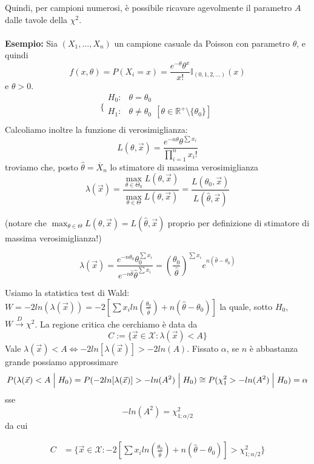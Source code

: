 Quindi, per campioni numerosi, è possibile ricavare agevolmente il parametro $A$ dalle tavole della $\chi^2$.\\
\\
\noindent \textbf{Esempio:} Sia $(X_1,...,X_n)$ un campione casuale da Poisson con parametro $\theta$, e quindi $$f(x,\theta) = P(X_i = x) = \frac{e^{-\theta} \theta^x}{x!} \mathbb{I}_{(0,1,2,...)}(x)$$ e $\theta>0$.
$$\bigg \{
\begin{array}{rl}
H_0: & \theta = \theta_0  \\
H_1: & \theta \neq \theta_0 \ \ [\theta \in \mathbb{R}^+ \setminus \{\theta_0\}]\\
\end{array}
$$
Calcoliamo inoltre la funzione di verosimiglianza:
$$L(\theta,\vec{x})=\frac{e^{-n\theta} \theta^{\sum x_i}}{\prod_{i=1}^n x_i!}$$
troviamo che, posto $\hat{\theta} = \overline{X}_n$ lo stimatore di massima verosimiglianza
$$\lambda(\vec{x}) = \frac{\max_{\theta \in \Theta_0} L(\theta,\vec{x})}{\max_{\theta \in \Theta} L(\theta,\vec{x})} = \frac{L(\theta_0,\vec{x})}{L(\hat{\theta},\vec{x})}$$

(notare che $\max_{\theta \in \Theta} L(\theta,\vec{x})=L(\hat{\theta},\vec{x}) $ proprio per definizione di stimatore di massima verosimiglianza!)

$$\lambda(\vec{x}) = \dfrac{ e^{-n\theta_0} \theta_0^{\sum x_i}}{e^{-n\hat{\theta}} \hat{\theta}^{\sum x_i}} = 
\left( \frac{\theta_0}{\hat{\theta}} \right)^{\sum x_i} e^{n(\hat{\theta} - \theta_0)}$$

Usiamo la statistica test di Wald:
$W = -2 ln (\lambda (\vec{x})) =  -2\left[\sum x_i ln \left( \frac{\theta_0}{\hat{\theta}} \right) + n(\hat{\theta} - \theta_0) \right]$
la quale, sotto $H_0$, $W \stackrel{D}{\longrightarrow} \chi^2$.
La regione critica che cerchiamo è data da
$$C := \{ \vec{x} \in \mathcal{X}: \lambda(\vec{x})<A \}$$
Vale $\lambda(\vec{x})<A \Leftrightarrow -2ln[ \lambda(\vec{x})]> -2ln(A)$.
Fissato $\alpha$, se $n$ è abbastanza grande possiamo approssimare
 $$P(\lambda(\vec{x})<A \Bigm\vert H_0) = P(-2ln[ \lambda(\vec{x})]> -ln(A^2) \Bigm\vert H_0) \cong P(\chi^2_1> -ln(A^2)\Bigm\vert H_0) = \alpha$$ sse $$-ln(A^2) = \chi_{1;\alpha/2}^2$$ da cui 

\begin{align*}
C  &= \{ \vec{x} \in \mathcal{X}: -2\left[\sum x_i ln \left( \frac{\theta_0}{\hat{\theta}} \right) + n(\hat{\theta} - \theta_0) \right] >  \chi_{1;\alpha/2}^2 \}
\end{align*}